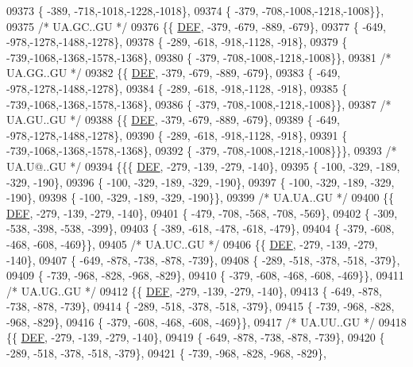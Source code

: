 \begin{DoxyCode}
09373 \{ -389, -718,-1018,-1228,-1018\},
09374 \{ -379, -708,-1008,-1218,-1008\}\},
09375 \textcolor{comment}{/* UA.GC..GU */}
09376 \{\{  \mbox{\hyperlink{1_88_84__epars_8h_a397419fc12b37ed479c8abb9d444d843}{DEF}}, -379, -679, -889, -679\},
09377 \{ -649, -978,-1278,-1488,-1278\},
09378 \{ -289, -618, -918,-1128, -918\},
09379 \{ -739,-1068,-1368,-1578,-1368\},
09380 \{ -379, -708,-1008,-1218,-1008\}\},
09381 \textcolor{comment}{/* UA.GG..GU */}
09382 \{\{  \mbox{\hyperlink{1_88_84__epars_8h_a397419fc12b37ed479c8abb9d444d843}{DEF}}, -379, -679, -889, -679\},
09383 \{ -649, -978,-1278,-1488,-1278\},
09384 \{ -289, -618, -918,-1128, -918\},
09385 \{ -739,-1068,-1368,-1578,-1368\},
09386 \{ -379, -708,-1008,-1218,-1008\}\},
09387 \textcolor{comment}{/* UA.GU..GU */}
09388 \{\{  \mbox{\hyperlink{1_88_84__epars_8h_a397419fc12b37ed479c8abb9d444d843}{DEF}}, -379, -679, -889, -679\},
09389 \{ -649, -978,-1278,-1488,-1278\},
09390 \{ -289, -618, -918,-1128, -918\},
09391 \{ -739,-1068,-1368,-1578,-1368\},
09392 \{ -379, -708,-1008,-1218,-1008\}\}\},
09393 \textcolor{comment}{/* UA.U@..GU */}
09394 \{\{\{  \mbox{\hyperlink{1_88_84__epars_8h_a397419fc12b37ed479c8abb9d444d843}{DEF}}, -279, -139, -279, -140\},
09395 \{ -100, -329, -189, -329, -190\},
09396 \{ -100, -329, -189, -329, -190\},
09397 \{ -100, -329, -189, -329, -190\},
09398 \{ -100, -329, -189, -329, -190\}\},
09399 \textcolor{comment}{/* UA.UA..GU */}
09400 \{\{  \mbox{\hyperlink{1_88_84__epars_8h_a397419fc12b37ed479c8abb9d444d843}{DEF}}, -279, -139, -279, -140\},
09401 \{ -479, -708, -568, -708, -569\},
09402 \{ -309, -538, -398, -538, -399\},
09403 \{ -389, -618, -478, -618, -479\},
09404 \{ -379, -608, -468, -608, -469\}\},
09405 \textcolor{comment}{/* UA.UC..GU */}
09406 \{\{  \mbox{\hyperlink{1_88_84__epars_8h_a397419fc12b37ed479c8abb9d444d843}{DEF}}, -279, -139, -279, -140\},
09407 \{ -649, -878, -738, -878, -739\},
09408 \{ -289, -518, -378, -518, -379\},
09409 \{ -739, -968, -828, -968, -829\},
09410 \{ -379, -608, -468, -608, -469\}\},
09411 \textcolor{comment}{/* UA.UG..GU */}
09412 \{\{  \mbox{\hyperlink{1_88_84__epars_8h_a397419fc12b37ed479c8abb9d444d843}{DEF}}, -279, -139, -279, -140\},
09413 \{ -649, -878, -738, -878, -739\},
09414 \{ -289, -518, -378, -518, -379\},
09415 \{ -739, -968, -828, -968, -829\},
09416 \{ -379, -608, -468, -608, -469\}\},
09417 \textcolor{comment}{/* UA.UU..GU */}
09418 \{\{  \mbox{\hyperlink{1_88_84__epars_8h_a397419fc12b37ed479c8abb9d444d843}{DEF}}, -279, -139, -279, -140\},
09419 \{ -649, -878, -738, -878, -739\},
09420 \{ -289, -518, -378, -518, -379\},
09421 \{ -739, -968, -828, -968, -829\},

\end{DoxyCode}
